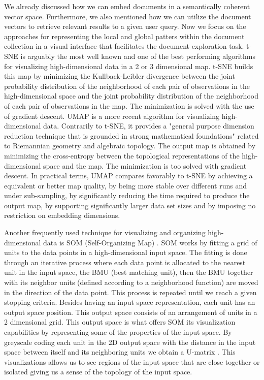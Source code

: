 \documentclass[a4paper]{article}
\begin{document}
We already discussed how we can embed documents in a semantically coherent vector space. Furthermore, we also mentioned how we can utilize the document vectors to retrieve relevant results to a given user query. Now we focus on the approaches for representing the local and global patters within the document collection in a visual interface that facilitates the document exploration task. t-SNE \citep{vandermaaten2008} is arguably the most well known and one of the best performing algorithms for visualizing high-dimensional data in a 2 or 3 dimensional map. t-SNE builds this map by minimizing the Kullback-Leibler divergence between the joint probability distribution of the neighborhood of each pair of observations in the high-dimensional space and the joint probability distribution of the neighborhood of each pair of observations in the map. The minimization is solved with the use of gradient descent. UMAP \citep{mcinnes2020} is a more recent algorithm for visualizing high-dimensional data. Contrarily to t-SNE, it provides a "general purpose dimension reduction technique that is grounded in strong mathematical foundations" \citep{mcinnes2020} related to Riemannian geometry and algebraic topology. The output map is obtained by minimizing the cross-entropy between the topological representations of the high-dimensional space and the map. The minimization is too solved with gradient descent. In practical terms, UMAP compares favorably to t-SNE \citep{mcinnes2020} by achieving a equivalent or better map quality, by being more stable over different runs and under sub-sampling, by significantly reducing the time required to produce the output map, by supporting significantly larger data set sizes and by imposing no restriction on embedding dimensions.

Another frequently used technique for visualizing and organizing high-dimensional data is SOM (Self-Organizing Map) \citep{Kohonen1982}. SOM works by fitting a grid of units to the data points in a high-dimensional input space. The fitting is done through an iterative process where each data point is allocated to the nearest unit in the input space, the BMU (best matching unit), then the BMU together with its neighbor units (defined according to a neighborhood function) are moved in the direction of the data point. This process is repeated until we reach a given stopping criteria. Besides having an input space representation, each unit has an output space position. This output space consists of an arrangement of units in a 2 dimensional grid. This output space is what offers SOM its visualization capabilities by representing some of the properties of the input space. By greyscale coding each unit in the 2D output space with the distance in the input space between itself and its neighboring units we obtain a U-matrix \citep{ultsch1993}. This visualizations allows us to see regions of the input space that are close together or isolated giving us a sense of the topology of the input space.
\end{document}
